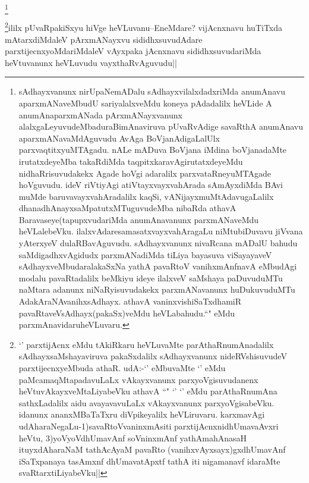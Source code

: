 \begin{artha}
\footnote{sAdhayxvanunx nirUpaNemADalu sAdhayxvilalxdadxriMda anumAnavu aparxmANaveMbudU sariyalalxveMdu koneya pAdadalilx heVLide A anumAnaparxmANada pArxmANayxvanunx alalxgaLeyuvudeMbaduraBimAnaviruva pUvaRvAdige savaRthA anumAnavu aparxmANavaMdAguvudu AvAga BoVjanAdigaLalUlx parxvaqtitxyuMTAgadu. nALe mADuva BoVjana iMdina boVjanadaMte irutatxdeyeMba takaRdiMda taqpitxkaravAgirutatxdeyeMdu nidhaRrisuvudakekx Agade hoVgi adaralilx parxvataRneyuMTAgade hoVguvudu. ideV riVtiyAgi atiVtayxvayxvahArada sAmAyxdiMda BAvi muMde baruvavayxvahAradalilx kaqSi, vANijayxmuMtAdavugaLalilx dhanadhAnayxsaMpatutxMTuguvudeMba nibaRda athavA Baravaseye(tapupxvudariMda anumAnavanunx parxmANaveMdu heVLalebeVku. ilalxvAdaresamasatxvayxvahAragaLu niMtubiDuvavu jiVvana yAterxyeV dulaRBavAguvudu. sAdhayxvanunx nivaRcana mADalU bahudu saMdigadhxvAgidudx parxmANadiMda tiLiya bayasuva viSayayaveV sAdhayxveMbudaralakaSxNa yathA pavaRtoV vanihxmAnfnavA eMbudAgi modalu pavaRtadalilx beMkiyu ideye ilalxveV saMshaya paDuvuduMTu naMtara adanunx niNaRyisuvudakekx parxmANavanunx huDukuvuduMTu AdakAraNAvanihxsAdhayx. athavA vaninxvishiSaTxdhamiR pavaRtaveVsAdhayx(pakaSx)veMdu heVLabahudu.``\stext" eMdu parxmAnavidaruheVLuvaru.}
\end{artha}

\begin{artha}
\footnote{`\stext' parxtijAcnx eMdu tAkiRkaru heVLuvaMte parAthaRnumAnadalilx sAdhayxsaMshayaviruva pakaSxdalilx sAdhayxvanunx nideRVshisuvudeV parxtijecnxyeMbuda athaR. udA:-`\stext' eMbuvaMte `\stext' eMdu paMcamaqMtapadavuLaLx vAkayxvanunx parxyoVgisuvudanenx heVtuvAkayxveMtaLiyabeVku athavA ``\stext" `\stext' `\stext' eMdu parAthaRnumAna sathxLadalilx aidu avayavavuLaLx vAkayxvanunx parxyoVgisabeVku. idanunx ananxMBaTaTxru diVpikeyalilx heVLiruvaru. karxmavAgi udAharaNegaLu-1)savaRtoVvaninxmAsiti parxtijAcnxnidhUmavaAvxri heVtu, 3)yoVyoVdhUmavAnf soV\s ninxmAnf yathAmahAnasaH ituyxdAharaNaM tathAcAyaM pavaRto (vanihxvAyxsayx)gxdhUmavAnf  iSaTxpanaya tasAmxnf dhUmavatApxtf tathA  iti nigamanavf idaraMte svaRtarxtiLiyabeVku||}ililx pUvaRpakiSxyu hiVge heVLuvanu--EneMdare? vijAcnxnavu huTiTxda mAtarxdiMdaleV pArxmANayxvu sididhxsuvudAdare parxtijecnxyoMdariMdaleV vAyxpaka jAcnxnavu sididhxsuvudariMda heVtuvanunx heVLuvudu vayxthaRvAguvudu||
\end{artha}

